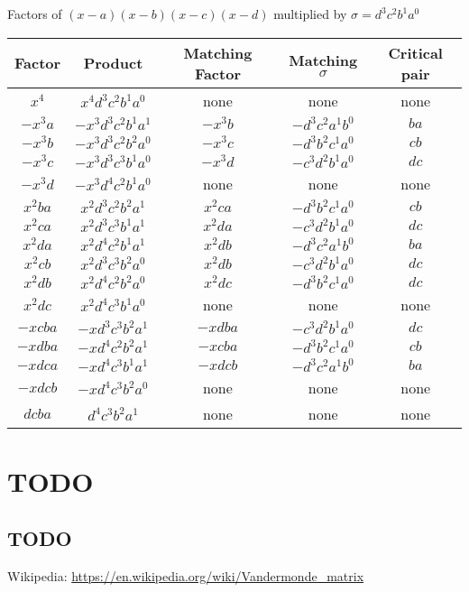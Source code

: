 \documentclass[11pt, oneside]{article} 	%
\begin{document}
Factors of $(x-a)(x-b)(x-c)(x-d)$ multiplied by $\sigma = d^3c^2b^1a^0$

\begin{center}
\begin{tabular}{||c c c c c||} 
 \hline
 Factor & Product & Matching Factor & Matching $\sigma$ & Critical pair \\ [0.5ex] 
 \hline\hline
 $x^4$ & $x^4d^3c^2b^1a^0$ & none & none & none \\ 
 \hline
 $-x^3a$ & $-x^3d^3c^2b^1a^1$ & $-x^3b$ & $-d^3c^2a^1b^0$ & $ba$ \\ 
 \hline
 $-x^3b$ & $-x^3d^3c^2b^2a^0$ & $-x^3c$ & $-d^3b^2c^1a^0$ & $cb$ \\ 
 \hline
 $-x^3c$ & $-x^3d^3c^3b^1a^0$ & $-x^3d$ & $-c^3d^2b^1a^0$ & $dc$ \\ 
 \hline
 $-x^3d$ & $-x^3d^4c^2b^1a^0$ & none & none & none \\ 
 \hline
 $x^2ba$ & $x^2d^3c^2b^2a^1$ & $x^2ca $& $-d^3b^2c^1a^0$ &  $cb$ \\ 
  \hline
 $x^2ca$ & $x^2d^3c^3b^1a^1$ & $x^2da $& $-c^3d^2b^1a^0$ &  $dc$ \\ 
 \hline
 $x^2da$ & $x^2d^4c^2b^1a^1$ & $x^2db $& $-d^3c^2a^1b^0$ &  $ba$ \\ 

 \hline
 $x^2cb$ & $x^2d^3c^3b^2a^0$ & $x^2db $& $-c^3d^2b^1a^0$ &  $dc$ \\ 
 \hline
 $x^2db$ & $x^2d^4c^2b^2a^0$ & $x^2dc $& $-d^3b^2c^1a^0$ &  $dc$ \\ 
 
 
\hline
 $x^2dc$ & $x^2d^4c^3b^1a^0$ & none & none &  none \\ 
 
 \hline
 $-xcba$ & $-xd^3c^3b^2a^1$ & $-xdba $& $-c^3d^2b^1a^0$ &  $dc$ \\ 

 \hline
 $-xdba$ & $-xd^4c^2b^2a^1$ & $-xcba $& $-d^3b^2c^1a^0$ &  $cb$ \\ 

 \hline
 $-xdca$ & $-xd^4c^3b^1a^1$ & $-xdcb $& $-d^3c^2a^1b^0$ &  $ba$ \\ 

 \hline
 $-xdcb$ & $-xd^4c^3b^2a^0$ & none & none &  none \\ 
 
 
 \hline
 $dcba$ & $ d^4c^3b^2a^1 $ & none & none &  none \\ 
 
 \hline
\end{tabular}
\end{center}


\section{TODO}
\subsection{TODO}

\begin{thebibliography}{9}
Wikipedia: \url{https://en.wikipedia.org/wiki/Vandermonde_matrix}
\end{thebibliography}
\end{document}
